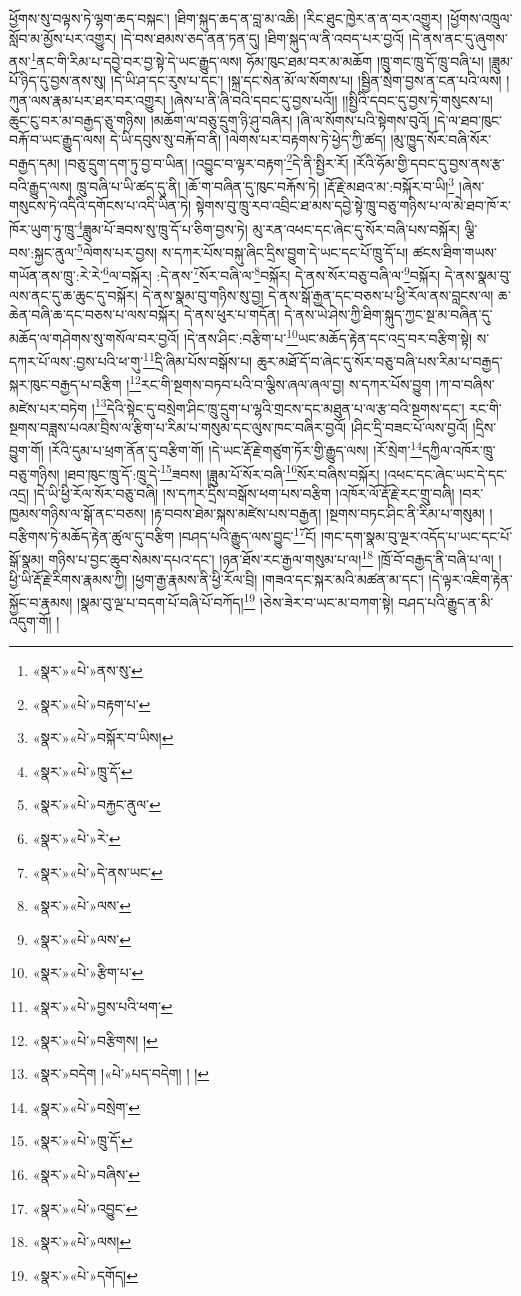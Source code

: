 ཕྱོགས་སུ་བལྟས་ཏེ་ལྷག་ཆད་བསྐང་། །ཐིག་སྐུད་ཆད་ན་བླ་མ་འཆི། །རིང་ཐུང་ཁྱེར་ན་ན་བར་འགྱུར། །ཕྱོགས་འཁྲུལ་སློབ་མ་མྱོས་པར་འགྱུར། །དེ་བས་ཐམས་ཅད་ནན་ཏན་དུ། །ཐིག་སྐུད་ལ་ནི་འབད་པར་བྱའོ། །དེ་ནས་ནང་དུ་ཞུགས་ནས་\footnote{«སྣར་»«པེ་»ནས་སུ་}ནང་གི་རིམ་པ་དབྱེ་བར་བྱ་སྟེ་དེ་ཡང་རྒྱུད་ལས། ཧོམ་ཁུང་ཐམ་བར་མ་མཆོག །ཁྲུ་གང་ཁྲུ་དོ་ཁྲུ་བཞི་པ། །ཟླུམ་པོ་ཉིད་དུ་བྱས་ནས་སུ། །དེ་ཡི་ཤ་དང་རུས་པ་དང་། །སྐྲ་དང་སེན་མོ་ལ་སོགས་པ། །སྦྱིན་སྲེག་བྱས་ན་ངན་པའི་ལས། །ཀུན་ལས་རྣམ་པར་ཐར་བར་འགྱུར། །ཞེས་པ་ནི་ཞི་བའི་དབང་དུ་བྱས་པའོ།། །།སྤྱིའི་དབང་དུ་བྱས་ཏེ་གསུངས་པ། ཆུང་ངུ་བར་མ་བརྒྱད་ཅུ་གཉིས། །མཆོག་ལ་བཅུ་དྲུག་ཉི་ཤུ་བཞིར། །ཞི་ལ་སོགས་པའི་སྟེགས་བུའོ། །དེ་ལ་ཐབ་ཁུང་བརྐོ་བ་ཡང་རྒྱུད་ལས། དེ་ཡི་དབུས་སུ་བརྐོ་བ་ནི། །ལེགས་པར་བརྟགས་ཏེ་ཕྱེད་ཀྱི་ཚད། །མུ་ཁྱུད་སོར་བཞི་སོར་བརྒྱད་དམ། །བཅུ་དྲུག་དག་ཏུ་བྱ་བ་ཡིན། །འབྱུང་བ་ལྟར་བརྟག་\footnote{«སྣར་»«པེ་»བརྟག་པ་}དེ་ནི་སྤྱིར་རོ། །རོའི་ཧོམ་གྱི་དབང་དུ་བྱས་ནས་རྩ་བའི་རྒྱུད་ལས། ཁྲུ་བཞི་པ་ཡི་ཚད་དུ་ནི། །ཆོ་ག་བཞིན་དུ་ཁུང་བརྐོས་ཏེ། །རྡོ་རྗེ་མཐའ་མ་:བསྐོར་བ་ཡི།\footnote{«སྣར་»«པེ་»བསྐོར་བ་ཡིས།} །ཞེས་གསུངས་ཏེ་འདིའི་དགོངས་པ་འདི་ཡིན་ཏེ། སྟེགས་བུ་ཁྲུ་རབ་འབྲིང་ཐ་མས་དབྱེ་སྟེ་ཁྲུ་བཅུ་གཉིས་པ་ལ་མེ་ཐབ་ཁོ་ར་ཁོར་ཡུག་ཏུ་ཁྲུ་\footnote{«སྣར་»«པེ་»ཁྲུ་དོ་}ཟླུམ་པོ་ཟབས་སུ་ཁྲུ་དོ་པ་ཅིག་བྱས་ཏེ། མུ་རན་འཕང་དང་ཞེང་དུ་སོར་བཞི་པས་བསྐོར། ལྕི་བས་:སྐྱང་ནུལ་\footnote{«སྣར་»«པེ་»བརྐྱང་ནུལ་}ལེགས་པར་བྱས། ས་དཀར་པོས་བསྐུ་ཞིང་དྲིས་བྱུག་དེ་ཡང་དང་པོ་ཁྲུ་དོ་པ། ཚངས་ཐིག་གཡས་གཡོན་ནས་ཁྲུ་:རེ་རེ་\footnote{«སྣར་»«པེ་»རེ་}ལ་བསྐོར། :དེ་ནས་\footnote{«སྣར་»«པེ་»དེ་ནས་ཡང་}སོར་བཞི་ལ་\footnote{«སྣར་»«པེ་»ལས་}བསྐོར། དེ་ནས་སོར་བཅུ་བཞི་ལ་\footnote{«སྣར་»«པེ་»ལས་}བསྐོར། དེ་ནས་སྣམ་བུ་ལས་ནང་དུ་ཆ་ཆུང་དུ་བསྐོར། དེ་ནས་སྣམ་བུ་གཉིས་སུ་བྱ། དེ་ནས་སྒོ་རྒྱན་དང་བཅས་པ་ཕྱི་རོལ་ནས་བླངས་ལ། ཆ་ཆེན་བཞི་ཆ་དང་བཅས་པ་ལས་བསྐོར། དེ་ནས་ཕུར་པ་གདོན། དེ་ནས་ཡེ་ཤེས་ཀྱི་ཐིག་སྐུད་ཀྱང་སྔ་མ་བཞིན་དུ་མཆོད་ལ་གཤེགས་སུ་གསོལ་བར་བྱའོ། །དེ་ནས་ཤིང་:བརྩིག་པ་\footnote{«སྣར་»«པེ་»རྩིག་པ་}ཡང་མཆོད་རྟེན་དང་འདྲ་བར་བརྩིག་སྟེ། ས་དཀར་པོ་ལས་:བྱས་པའི་ཕ་གུ་\footnote{«སྣར་»«པེ་»བྱས་པའི་ཕག་}དྲི་ཞིམ་པོས་བསྒོས་པ། ཆུར་མཐོ་དོ་བ་ཞེང་དུ་སོར་བཅུ་བཞི་པས་རིམ་པ་བརྒྱད་སྐར་ཁུང་བརྒྱད་པ་བརྩིག །\footnote{«སྣར་»«པེ་»བརྩིགས། །}རང་གི་སྔགས་བཏབ་པའི་བ་ལྕིས་ཞལ་ཞལ་བྱ། ས་དཀར་པོས་བྱུག །ཀ་བ་བཞིས་མཛེས་པར་བཏེག །\footnote{«སྣར་»བདེག །«པེ་»པད་བདེག། ། །}དེའི་སྟེང་དུ་བསྲེག་ཤིང་ཁྲུ་དྲུག་པ་ལྷའི་གྲངས་དང་མཐུན་པ་ལ་རྩ་བའི་སྔགས་དང་། རང་གི་སྔགས་བཟླས་པའམ་བྲིས་ལ་རྩིག་པ་རིམ་པ་གསུམ་དང་ལུས་ཁང་བཞིར་བྱའོ། །ཤིང་དྲི་བཟང་པོ་ལས་བྱའོ། །དྲིས་བྱུག་གོ། །རོའི་དུམ་པ་ཕྲག་ནོན་དུ་བརྩིག་གོ། །དེ་ཡང་རྡོ་རྗེ་གཙུག་ཏོར་གྱི་རྒྱུད་ལས། །རོ་སྲེག་\footnote{«སྣར་»«པེ་»བསྲེག་}དཀྱིལ་འཁོར་ཁྲུ་བཅུ་གཉིས། །ཐབ་ཁུང་ཁྲུ་དོ་:ཁྲུ་དེ་\footnote{«སྣར་»«པེ་»ཁྲུ་དོ་}ཟབས། །ཟླུམ་པོ་སོར་བཞི་\footnote{«སྣར་»«པེ་»བཞིས་}སོར་བཞིས་བསྐོར། །འཕང་དང་ཞེང་ཡང་དེ་དང་འདྲ། །དེ་ཡི་ཕྱི་རོལ་སོར་བཅུ་བཞི། །ས་དཀར་དྲིས་བསྒོས་ཕག་པས་བརྩིག །འཁོར་ལོ་རྡོ་རྗེ་རང་གྲུ་བཞི། །བར་ཁྱམས་གཉིས་ལ་སྒོ་ནང་བཅས། །རྟ་བབས་ཐེམ་སྐས་མཛེས་པས་བརྒྱན། །སྔགས་བཏང་ཤིང་ནི་རིམ་པ་གསུམ། །བརྩིགས་ཏེ་མཆོད་རྟེན་ཚུལ་དུ་བརྩིག །བཤད་པའི་རྒྱུད་ལས་བྱུང་\footnote{«སྣར་»«པེ་»འབྱུང་}ངོ། །གང་དག་སྣམ་བུ་ལྔར་འདོད་པ་ཡང་དང་པོ་སྒོ་སྣམ། གཉིས་པ་བྱང་ཆུབ་སེམས་དཔའ་དང་། །ཉན་ཐོས་རང་རྒྱལ་གསུམ་པ་ལ།\footnote{«སྣར་»«པེ་»ལས།} །ཁྲོ་བོ་བརྒྱད་ནི་བཞི་པ་ལ། །ཕྱི་ཡི་རྡོ་རྗེ་རིགས་རྣམས་ཀྱི། །ཕྱག་རྒྱ་རྣམས་ནི་ཕྱི་རོལ་བྲི། །གཟའ་དང་སྐར་མའི་མཚན་མ་དང་། །དེ་ལྟར་འཇིག་རྟེན་སྐྱོང་བ་རྣམས། །སྣམ་བུ་ལྔ་པ་བདག་པོ་བཞི་པོ་བཀོད།\footnote{«སྣར་»«པེ་»དགོད།} །ཅེས་ཟེར་བ་ཡང་མ་བཀག་སྟེ། བཤད་པའི་རྒྱུད་ན་མི་འདུག་གོ། །
